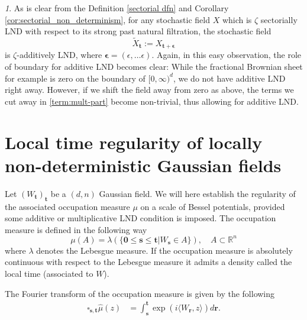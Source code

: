 \documentclass[11pt,oneside,english,reqno]{amsart}
\numberwithin{equation}{section}
\numberwithin{figure}{section}
\theoremstyle{plain}
\theoremstyle{definition}
\theoremstyle{remark}
\newtheorem{rem}[thm]{\protect\remarkname}
\theoremstyle{plain}
\theoremstyle{plain}
\theoremstyle{plain}
\theoremstyle{plain}
\theoremstyle{plain}
\providecommand{\remarkname}{Remark}
\newcommand{\RR}{\mathbb{R}}
\newcommand{\br}{\mathbf{r}}
\newcommand{\bepsilon}{{\boldsymbol\epsilon}}
\newcommand{\bs}{\mathbf{s}}
\newcommand{\bt}{\mathbf{t}}
\begin{document}
\begin{rem}
As is clear from the Definition \ref{sectorial dfn} and Corollary \ref{cor:sectorial_non_determinism}, for any stochastic field $X$ which is $\zeta$ sectorially LND with respect to its strong past natural filtration, the stochastic field 
\[
\tilde{X}_\bt:=X_{\bt+\mathbf{\bepsilon}}
\]
is $\zeta$-additively LND, where $\mathbf{\bepsilon}=(\epsilon, \dots \epsilon)$. Again, in this easy observation, the role of boundary for additive LND becomes clear: While the fractional Brownian sheet for example is zero on the boundary of $[0, \infty)^d$, we do not have additive LND right away. However, if we shift the field away from zero as above, the terms we cut away in \eqref{term:mult-part} become non-trivial, thus allowing for additive LND. 
\end{rem}





\section{Local time regularity of locally non-deterministic Gaussian fields}\label{sec_Local_Time}
\noindent Let $(W_\bt)_\bt$ be a $(d, n)$ Gaussian field. We will here establish the regularity of the associated occupation measure $\mu$ on a scale of Bessel potentials, provided some additive or multiplicative LND condition is imposed. The occupation measure is defined in the following way
\begin{equation*}
    \mu(A)=\lambda(\{\mathbf{0}\leq \bs \leq \bt| W_{\bs}\in A\}),  \quad A\subset \RR^n
\end{equation*}
where $\lambda$ denotes the Lebesgue measure. 
If the occupation measure is absolutely continuous with respect to the Lebesgue measure it admits a density called the local time (associated to $W$). 


The Fourier transform of the occupation measure is given by the following
\begin{align*}
    \square_{\bs, \bt}\hat{\mu}(z)&=\int_{\bs}^{\bt} \exp(i\langle W_{\br}, z\rangle)d\br.
\end{align*}
\end{document}
